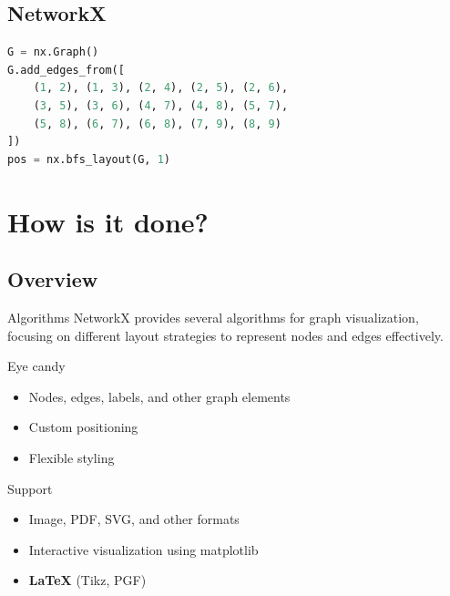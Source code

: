 \documentclass[11pt]{beamer}
\begin{document}
\subsection{NetworkX}
\begin{frame}{\subsecname}
\begin{figure}
\resizebox{0.8\textwidth}{!}{}
\end{figure}
\end{frame}

\begin{frame}[fragile]{\subsecname}
    \begin{block}{}
        \begin{lstlisting}[language=python]
G = nx.Graph()
G.add_edges_from([
    (1, 2), (1, 3), (2, 4), (2, 5), (2, 6),
    (3, 5), (3, 6), (4, 7), (4, 8), (5, 7),
    (5, 8), (6, 7), (6, 8), (7, 9), (8, 9)
])
pos = nx.bfs_layout(G, 1)
        \end{lstlisting}
    \end{block}
\end{frame}

\section{How is it done?}

\subsection{Overview}
\begin{frame}{\subsecname}
    \begin{block}{Algorithms}
        NetworkX provides several algorithms for graph visualization, focusing
        on different layout strategies to represent nodes and edges effectively.
    \end{block}

    \pause
    \begin{block}{Eye candy}
        \begin{itemize}
            \pause
            \item Nodes, edges, labels, and other graph elements
            \pause
            \item Custom positioning
            \pause
            \item Flexible styling
        \end{itemize}
    \end{block}

    \pause
    \begin{block}{Support}
        \begin{itemize}
            \pause
            \item Image, PDF, SVG, and other formats
            \pause
            \item Interactive visualization using matplotlib
            \pause
            \item \textbf{LaTeX} (Tikz, PGF)
        \end{itemize}
    \end{block}
\end{frame}
\end{document}
